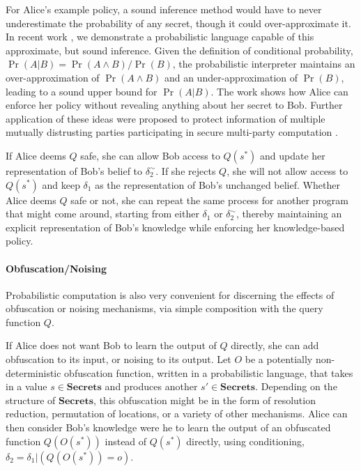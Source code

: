 \documentclass{article} %
\newcommand{\secrets}[0]{\textbf{Secrets}}
\newcommand{\asecret}[0]{s}
\newcommand{\rsecret}[0]{\asecret^*}
\newcommand{\paren}[1]{\left( #1 \right)}
\newcommand{\cond}[0]{|}
\theoremstyle{plain} %
\theoremstyle{definition} %
\begin{document}
For Alice's example policy, a sound inference method would have to
never underestimate the probability of any secret, though it could
over-approximate it. In recent work \cite{mardziel11belief,
mardziel12belieflong}, we demonstrate a probabilistic language capable
of this approximate, but sound inference. Given the definition of
conditional probability, $
\Pr(A | B) = \Pr(A \wedge B) / \Pr(B) $, the probabilistic interpreter
maintains an over-approximation of $ \Pr(A \wedge B) $ and an
under-approximation of $ \Pr(B) $, leading to a sound upper bound for
$
\Pr(A | B) $. The work shows how Alice can enforce her policy
without revealing anything about her secret to Bob. Further application
of these ideas were proposed to protect information of multiple
mutually distrusting parties participating in secure multi-party
computation \cite{mardziel12smc}.

If Alice deems $ Q $ safe, she can allow Bob access to $ Q(\rsecret) $
and update her representation of Bob's belief to $ \delta_2^\sim $. If
she rejects $ Q $, she will not allow access to $ Q(\rsecret) $ and
keep $ \delta_1 $ as the representation of Bob's unchanged
belief. Whether Alice deems $ Q $ safe or not, she can repeat the same
process for another program that might come around, starting from
either $ \delta_1 $ or $ \delta_2^\sim $, thereby maintaining an
explicit representation of Bob's knowledge while enforcing her
knowledge-based policy.

\paragraph*{Obfuscation/Noising} Probabilistic computation is also very
convenient for discerning the effects of obfuscation or noising
mechanisms, via simple composition with the query function $ Q $.

If Alice does not want Bob to learn the output of $ Q $ directly, she
can add obfuscation to its input, or noising to its output. Let $ O $
be a potentially non-deterministic obfuscation function, written in a
probabilistic language, that takes in a value $ \asecret \in \secrets
$ and produces another $ \asecret' \in \secrets $. Depending on the
structure of $ \secrets $, this obfuscation might be in the form of
resolution reduction, permutation of locations, or a variety of other
mechanisms. Alice can then consider Bob's knowledge were he to learn
the output of an obfuscated function $ Q(O(\rsecret)) $ instead of $
Q(\rsecret) $ directly, using conditioning, $ \delta_2 = \delta_1
\cond \paren{Q(O(\rsecret)) = o} $.
\end{document}
